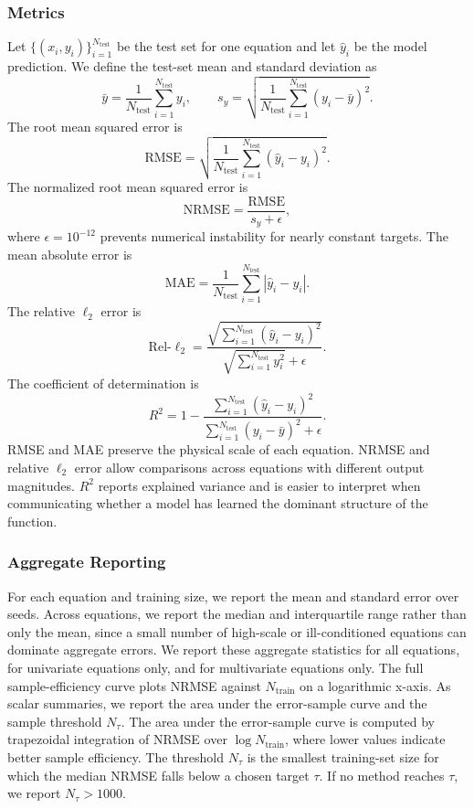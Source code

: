 \documentclass{article}
\begin{document}
\subsubsection{Metrics}

Let $\{(x_i,y_i)\}_{i=1}^{N_{\mathrm{test}}}$ be the test set for one equation and let $\hat{y}_i$ be the model prediction.
We define the test-set mean and standard deviation as
\[
\bar{y}=\frac{1}{N_{\mathrm{test}}}\sum_{i=1}^{N_{\mathrm{test}}}y_i,
\qquad
s_y=\sqrt{\frac{1}{N_{\mathrm{test}}}\sum_{i=1}^{N_{\mathrm{test}}}(y_i-\bar{y})^2}.
\]
The root mean squared error is
\[
\mathrm{RMSE}=\sqrt{\frac{1}{N_{\mathrm{test}}}\sum_{i=1}^{N_{\mathrm{test}}}(\hat{y}_i-y_i)^2}.
\]
The normalized root mean squared error is
\[
\mathrm{NRMSE}=\frac{\mathrm{RMSE}}{s_y+\epsilon},
\]
where $\epsilon=10^{-12}$ prevents numerical instability for nearly constant targets.
The mean absolute error is
\[
\mathrm{MAE}=\frac{1}{N_{\mathrm{test}}}\sum_{i=1}^{N_{\mathrm{test}}}|\hat{y}_i-y_i|.
\]
The relative $\ell_2$ error is
\[
\mathrm{Rel}\text{-}\ell_2=\frac{\sqrt{\sum_{i=1}^{N_{\mathrm{test}}}(\hat{y}_i-y_i)^2}}{\sqrt{\sum_{i=1}^{N_{\mathrm{test}}}y_i^2}+\epsilon}.
\]
The coefficient of determination is
\[
R^2=1-\frac{\sum_{i=1}^{N_{\mathrm{test}}}(\hat{y}_i-y_i)^2}{\sum_{i=1}^{N_{\mathrm{test}}}(y_i-\bar{y})^2+\epsilon}.
\]
RMSE and MAE preserve the physical scale of each equation.
NRMSE and relative $\ell_2$ error allow comparisons across equations with different output magnitudes.
$R^2$ reports explained variance and is easier to interpret when communicating whether a model has learned the dominant structure of the function.

\subsubsection{Aggregate Reporting}

For each equation and training size, we report the mean and standard error over seeds.
Across equations, we report the median and interquartile range rather than only the mean, since a small number of high-scale or ill-conditioned equations can dominate aggregate errors.
We report these aggregate statistics for all equations, for univariate equations only, and for multivariate equations only.
The full sample-efficiency curve plots NRMSE against $N_{\mathrm{train}}$ on a logarithmic x-axis.
As scalar summaries, we report the area under the error-sample curve and the sample threshold $N_\tau$.
The area under the error-sample curve is computed by trapezoidal integration of NRMSE over $\log N_{\mathrm{train}}$, where lower values indicate better sample efficiency.
The threshold $N_\tau$ is the smallest training-set size for which the median NRMSE falls below a chosen target $\tau$.
If no method reaches $\tau$, we report $N_\tau>1000$.
\end{document}
